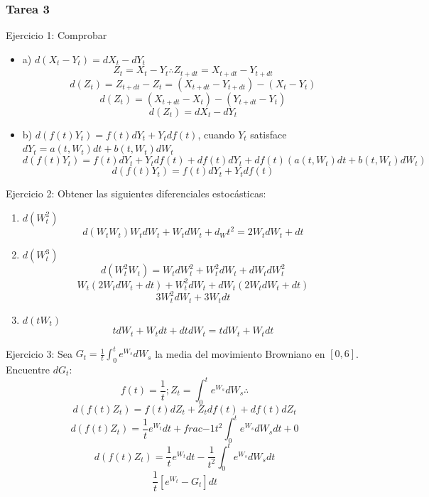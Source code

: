 \documentclass[11pt,fleqn]{book} %
\numberwithin{equation}{section} %
\numberwithin{figure}{section} %
\numberwithin{table}{section} %
\begin{document}
\subsubsection{Tarea 3}
Ejercicio 1: Comprobar
\begin{itemize}
    \item a) $d(X_{t} - Y_{t}) = dX_{t} - dY_{t} $
    $$ Z_{t} = X_{t} - Y_{t} \therefore Z_{t+dt} = X_{t+dt} - Y_{t+dt}   $$
    $$d(Z_{t}) = Z_{t+dt}-Z_{t} = (X_{t+dt} - Y_{t+dt}) - (X_{t}-Y_{t})$$
    $$ d(Z_{t}) = (X_{t+dt} -X_{t}) -(Y_{t+dt}-Y_{t}) $$
    $$ d(Z_{t}) = dX_{t} - dY_{t} $$
    \item b) $d(f(t)Y_{t}) = f(t)dY_{t} + Y_{t}df(t)$, cuando $Y_{t}$ satisface $dY_{t} = a(t,W_{t})dt + b(t,W_{t})dW_{t} $
    $$ d(f(t)Y_{t}) = f(t)dY_{t} + Y_{t}df(t) + df(t)dY_{t} + df(t)(a(t,W_{t})dt + b(t,W_{t})dW_{t})     $$
    $$ d(f(t)Y_{t}) = f(t)dY_{t} + Y_{t}df(t) $$
\end{itemize}
Ejercicio 2: Obtener las siguientes diferenciales estocásticas:
\begin{enumerate}
    \item $d(W_{t}^{2}) $
    $$ d(W_{t} W_{t}) W_{t}dW_{t} + W_{t}dW_{t} + d_W{t}^{2} = 2W_{t}dW_{t} + dt  $$
    \item $d(W_{t}^{3})$
    $$ d(W_{t}^{2}W_{t}) = W_{t}dW_{t}^{2} + W_{t}^{2}dW_{t} + dW_{t}dW_{t}^{2}  $$
    $$ W_{t}(2W_{t}dW_{t} + dt) + W_{t}^{2}dW_{t} + dW_{t}(2W_{t}dW_{t}+dt)      $$
    $$ 3W_{t}^{2}dW_{t} + 3W_{t}dt $$
    \item $d(tW_{t})$
    $$ tdW_{t} + W_{t}dt + dtdW_{t}  = tdW_{t} + W_{t}dt $$
\end{enumerate}
Ejercicio 3: Sea $G_{t} = \frac{1}{t} \int_{0}^{t} e^{W_{s}} dW_{s}$ la media del movimiento Browniano en $[0,6]$. Encuentre $dG_{t}$:
$$ f(t) =  \frac{1}{t} ; Z_{t} = \int_{0}^{t} e^{W_{s}} dW_{s} \therefore$$
$$ d(f(t)Z_{t}) = f(t)dZ_{t} + Z_{t}df(t) + df(t)dZ_{t}  $$
$$ d(f(t)Z_{t}) = \frac{1}{t} e^{W_{t}}dt + frac{-1}{t^{2}}\int_{0}^{t} e^{W_{s}} dW_{s} dt + 0 $$
$$ d(f(t)Z_{t}) = \frac{1}{t} e^{W_{t}}dt - \frac{1}{t^2} \int_{0}^{t} e^{W_{s}} dW_{s} dt $$
$$ \frac{1}{t}[e^{W_{t}} - G_{t}]dt      $$
\end{document}
